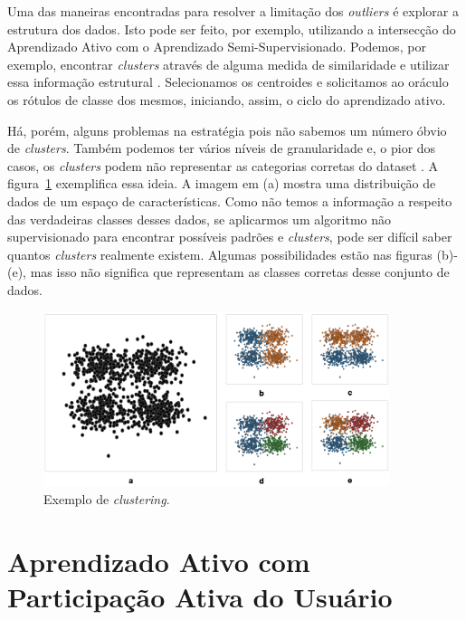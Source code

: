 Uma das maneiras encontradas para resolver a limitação dos \emph{outliers} é explorar a estrutura dos dados. Isto pode ser feito, por exemplo, utilizando a intersecção do Aprendizado Ativo com o Aprendizado Semi-Supervisionado. Podemos, por exemplo, encontrar \emph{clusters} através de alguma medida de similaridade e utilizar essa informação estrutural \citep{saito2014active, dasgupta2011two}. Selecionamos os centroides e solicitamos ao oráculo os rótulos de classe dos mesmos, iniciando, assim, o ciclo do aprendizado ativo. 

Há, porém, alguns problemas na estratégia pois não sabemos um número óbvio de \emph{clusters}. Também podemos ter vários níveis de granularidade e, o pior dos casos, os \emph{clusters} podem não representar as categorias corretas do dataset \citep{dasgupta2011two, settles2014active}.  A figura~\ref{fig:toy_example_clustering} exemplifica essa ideia. A imagem em (a) mostra uma distribuição de dados de um espaço de características. Como não temos a informação a respeito das verdadeiras classes desses dados, se aplicarmos um algoritmo não supervisionado para encontrar possíveis padrões e \emph{clusters}, pode ser difícil saber quantos \emph{clusters} realmente existem. Algumas possibilidades estão nas figuras (b)-(e), mas isso não significa que representam as classes corretas desse conjunto de dados. 


\begin{figure}
  \centering
  \includegraphics[width=0.9\textwidth]{figures/toy_example_clustering.png}
  \caption{Exemplo de \emph{clustering}.}
  \label{fig:toy_example_clustering}
\end{figure}


\section{Aprendizado Ativo com Participação Ativa do Usuário}
\label{sec:aprendizado_ativo_variacoes}

